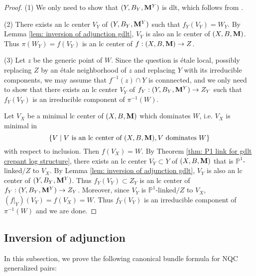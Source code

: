 \documentclass[11pt]{amsart}
\numberwithin{equation}{section}
\newcommand{\Mm}{{\bf{M}}}
\theoremstyle{definition}
\theoremstyle{definition}
\theoremstyle{definition}
\begin{document}
\begin{proof}
(1) We only need to show that $(Y,B_Y,\Mm^Y)$ is dlt, which follows from \cite[Lemma 2.9]{HL22}. 

(2) There exists an lc center $V_Y$ of $(Y,B_Y,\Mm^Y)$ such that $f_Y(V_Y)=W_Y$. By Lemma \ref{lem: inversion of adjunction gdlt}, $V_Y$ is also an lc center of $(X,B,\Mm)$. Thus $\pi(W_Y)=f(V_Y)$ is an lc center of $f: (X,B,\Mm)\rightarrow Z$.

(3) Let $z$ be the generic point of $W$. Since the question is \'etale local, possibly replacing $Z$ by an \'etale neighborhood of $z$ and replacing $Y$ with its irreducible components, we may assume that $f^{-1}(z)\cap Y$ is connnected, and we only need to show that there exists an lc center $V_Y$ of $f_Y: (Y,B_Y,\Mm^Y)\rightarrow Z_Y$ such that $f_Y(V_Y)$ is an irreducible component of $\pi^{-1}(W)$.

Let $V_X$ be a minimal lc center of $(X,B,\Mm)$ which dominates $W$, i.e. $V_X$ is minimal in
$$\{V\mid V\text{ is an lc center of }(X,B,\Mm), V\text{ dominates }W\}$$
with respect to inclusion. Then $f(V_X)=W$. By Theorem \ref{thm: P1 link for gdlt crepant log structure}, there exists an lc center $V_Y\subset Y$ of $(X,B,\Mm)$ that is $\mathbb P^1$-linked$/Z$ to $V_X$. By Lemma \ref{lem: inversion of adjunction gdlt}, $V_Y$ is also an lc center of $(Y,B_Y,\Mm^Y)$. Thus $f_Y(V_Y)\subset Z_Y$ is an lc center of $f_Y: (Y,B_Y,\Mm^Y)\rightarrow Z_Y$. Moreover, since $V_Y$ is $\mathbb P^1$-linked$/Z$ to $V_X$, $(f|_Y)(V_Y)=f(V_X)=W$. Thus $f_Y(V_Y)$ is an irreducible component of $\pi^{-1}(W)$ and we are done.
\end{proof}


\subsection{Inversion of adjunction} In this subsection, we prove the following canonical bundle formula for NQC generalized pairs:
\end{document}
